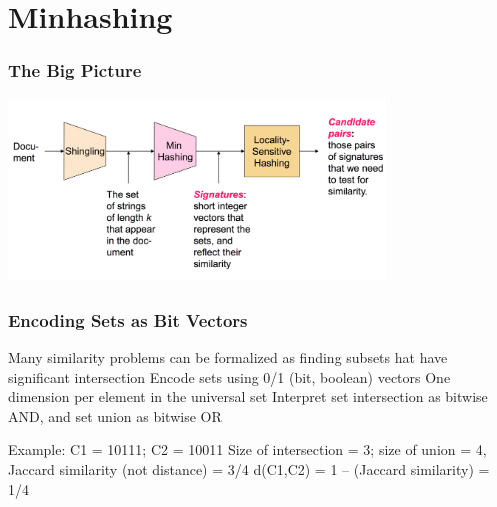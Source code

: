 \documentclass[svgnames]{beamer}
\begin{document}
\section{Minhashing}

  
\begin{frame} \frametitle{The Big Picture}

\includegraphics[width=10cm]{overall}

\end{frame}

  
\begin{frame} \frametitle{Encoding Sets as Bit Vectors}

Many similarity problems can be formalized as finding subsets hat have significant intersection
  Encode sets using 0/1 (bit, boolean) vectors
  One dimension per element in the universal set
  Interpret set intersection as bitwise AND, and set union as bitwise OR

Example: C1 = 10111; C2 = 10011
  Size of intersection = 3; size of union = 4, Jaccard similarity (not distance) = 3/4
  d(C1,C2) = 1 – (Jaccard similarity) = 1/4
  
\end{frame}

  
\end{document}
